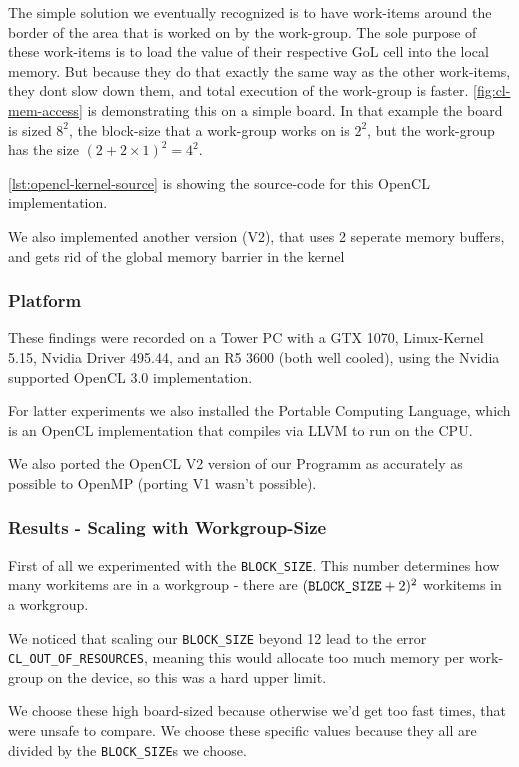 \documentclass[a4paper,english,12pt,twoside=false]{scrartcl} %
\begin{document}
The simple solution we eventually recognized is to have work-items around the border of the area that is worked on by the work-group.
The sole purpose of these work-items is to load the value of their respective GoL cell into the local memory. 
But because they do that exactly the same way as the other work-items, they dont slow down them, and total execution of the work-group is faster.
\autoref{fig:cl-mem-access} is demonstrating this on a simple board. 
In that example the board is sized $8^2$, the block-size that a work-group works on is $2^2$, but the work-group has the size $(2 + 2\times 1)^2 = 4^2$.

\autoref{lst:opencl-kernel-source} is showing the source-code for this OpenCL implementation.

We also implemented another version (V2), that uses 2 seperate memory buffers, and gets rid of the global memory barrier in the kernel

\subsubsection{Platform}

These findings were recorded on a Tower PC with a GTX 1070, Linux-Kernel 5.15, Nvidia Driver 495.44, and an R5 3600 (both well cooled), using the Nvidia supported OpenCL 3.0 implementation.

For latter experiments we also installed the Portable Computing Language, which is an OpenCL implementation that compiles via LLVM to run on the CPU.

We also ported the OpenCL V2 version of our Programm as accurately as possible to OpenMP (porting V1 wasn't possible).

\subsubsection{Results - Scaling with Workgroup-Size}

First of all we experimented with the \verb|BLOCK_SIZE|.
This number determines how many workitems are in a workgroup - there are $(\verb|BLOCK_SIZE| + 2)^2$ workitems in a workgroup.

We noticed that scaling our \verb|BLOCK_SIZE| beyond 12 lead to the error \verb|CL_OUT_OF_RESOURCES|,
meaning this would allocate too much memory per work-group on the device, so this was a hard upper limit.

We choose these high board-sized because otherwise we'd get too fast times, that were unsafe to compare.
We choose these specific values because they all are divided by the \verb|BLOCK_SIZE|s we choose.
\end{document}
